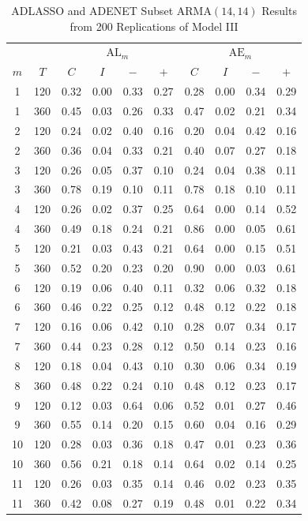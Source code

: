 \begin{table}[ht!]
\footnotesize
\centering
\caption{ADLASSO and ADENET Subset ARMA$(14,14)$ Results from 200 Replications of Model III}
\begin{tabular}{cc|cccc|cccc}
  \hline
    & & \multicolumn{4}{c|}{$\textrm{AL}_m$} & \multicolumn{4}{c}{$\textrm{AE}_m$} \\
      \cline{4-5}  \cline{8-9}
  $m$ & $T$ & $C$ & $I$ & $-$ & $+$ & $C$ & $I$ & $-$ & $+$ \\
  \hline
  1 & 120 & 0.32 & 0.00 & 0.33 & 0.27 & 0.28 & 0.00 & 0.34 & 0.29 \\ 
  1 & 360 & 0.45 & 0.03 & 0.26 & 0.33 & 0.47 & 0.02 & 0.21 & 0.34 \\ 
  2 & 120 & 0.24 & 0.02 & 0.40 & 0.16 & 0.20 & 0.04 & 0.42 & 0.16 \\ 
  2 & 360 & 0.36 & 0.04 & 0.33 & 0.21 & 0.40 & 0.07 & 0.27 & 0.18 \\ 
  3 & 120 & 0.26 & 0.05 & 0.37 & 0.10 & 0.24 & 0.04 & 0.38 & 0.11 \\ 
  3 & 360 & 0.78 & 0.19 & 0.10 & 0.11 & 0.78 & 0.18 & 0.10 & 0.11 \\ 
  \hline
  4 & 120 & 0.26 & 0.02 & 0.37 & 0.25 & 0.64 & 0.00 & 0.14 & 0.52 \\ 
  4 & 360 & 0.49 & 0.18 & 0.24 & 0.21 & 0.86 & 0.00 & 0.05 & 0.61 \\ 
  5 & 120 & 0.21 & 0.03 & 0.43 & 0.21 & 0.64 & 0.00 & 0.15 & 0.51 \\ 
  5 & 360 & 0.52 & 0.20 & 0.23 & 0.20 & 0.90 & 0.00 & 0.03 & 0.61 \\ 
  \hline
  6 & 120 & 0.19 & 0.06 & 0.40 & 0.11 & 0.32 & 0.06 & 0.32 & 0.18 \\ 
  6 & 360 & 0.46 & 0.22 & 0.25 & 0.12 & 0.48 & 0.12 & 0.22 & 0.18 \\ 
  7 & 120 & 0.16 & 0.06 & 0.42 & 0.10 & 0.28 & 0.07 & 0.34 & 0.17 \\ 
  7 & 360 & 0.44 & 0.23 & 0.28 & 0.12 & 0.50 & 0.14 & 0.23 & 0.16 \\ 
  8 & 120 & 0.18 & 0.04 & 0.43 & 0.10 & 0.30 & 0.06 & 0.34 & 0.19 \\ 
  8 & 360 & 0.48 & 0.22 & 0.24 & 0.10 & 0.48 & 0.12 & 0.23 & 0.17 \\ 
  \hline
  9 & 120 & 0.12 & 0.03 & 0.64 & 0.06 & 0.52 & 0.01 & 0.27 & 0.46 \\ 
  9 & 360 & 0.55 & 0.14 & 0.20 & 0.15 & 0.60 & 0.04 & 0.16 & 0.29 \\ 
  10 & 120 & 0.28 & 0.03 & 0.36 & 0.18 & 0.47 & 0.01 & 0.23 & 0.36 \\ 
  10 & 360 & 0.56 & 0.21 & 0.18 & 0.14 & 0.64 & 0.02 & 0.14 & 0.25 \\ 
  11 & 120 & 0.26 & 0.03 & 0.35 & 0.14 & 0.46 & 0.02 & 0.23 & 0.35 \\ 
  11 & 360 & 0.42 & 0.08 & 0.27 & 0.19 & 0.48 & 0.01 & 0.22 & 0.34 \\ 
   \hline
\end{tabular}
\label{tab:alaemod3}
\end{table}

